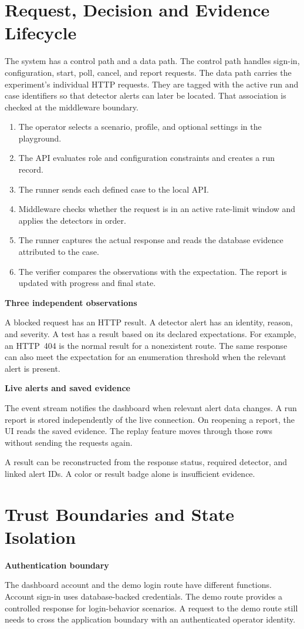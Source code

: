 \documentclass[11pt,a4paper,oneside]{report}
\newcommand{\topic}[1]{\smallskip\noindent\textbf{#1}\par\nobreak\vspace{-.39em}}
\newcommand{\sheet}[1]{\clearpage\section{#1}}
\newcommand{\callout}[1]{\noindent\colorbox{papergray}{\parbox{\dimexpr\linewidth-2\fboxsep\relax}{\small\strut #1\strut}}}
\begin{document}
\sheet{Request, Decision and Evidence Lifecycle}
The system has a control path and a data path. The control path handles sign-in, configuration, start, poll, cancel, and report requests. The data path carries the experiment's individual HTTP requests. They are tagged with the active run and case identifiers so that detector alerts can later be located. That association is checked at the middleware boundary.

\begin{enumerate}
\item The operator selects a scenario, profile, and optional settings in the playground.
\item The API evaluates role and configuration constraints and creates a run record.
\item The runner sends each defined case to the local API.
\item Middleware checks whether the request is in an active rate-limit window and applies the detectors in order.
\item The runner captures the actual response and reads the database evidence attributed to the case.
\item The verifier compares the observations with the expectation. The report is updated with progress and final state.
\end{enumerate}

\topic{Three independent observations}
A blocked request has an HTTP result. A detector alert has an identity, reason, and severity. A test has a result based on its declared expectations. For example, an HTTP~404 is the normal result for a nonexistent route. The same response can also meet the expectation for an enumeration threshold when the relevant alert is present.

\topic{Live alerts and saved evidence}
The event stream notifies the dashboard when relevant alert data changes. A run report is stored independently of the live connection. On reopening a report, the UI reads the saved evidence. The replay feature moves through those rows without sending the requests again.

\callout{A result can be reconstructed from the response status, required detector, and linked alert IDs. A color or result badge alone is insufficient evidence.}

\sheet{Trust Boundaries and State Isolation}
\topic{Authentication boundary}
The dashboard account and the demo login route have different functions. Account sign-in uses database-backed credentials. The demo route provides a controlled response for login-behavior scenarios. A request to the demo route still needs to cross the application boundary with an authenticated operator identity.
\end{document}
